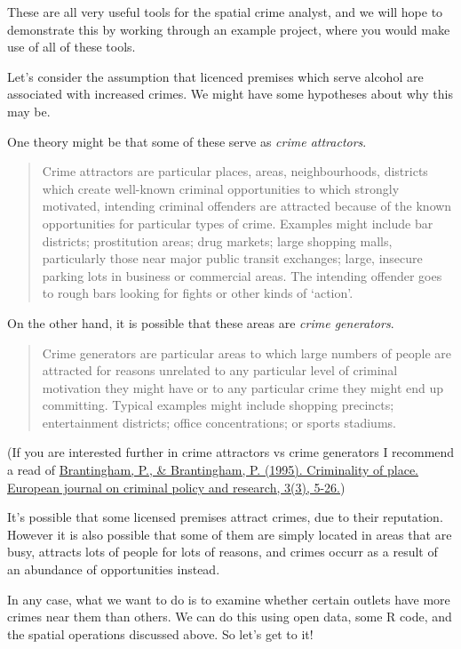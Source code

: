 \documentclass[]{book}
\begin{document}
These are all very useful tools for the spatial crime analyst, and we will hope to demonstrate this by working through an example project, where you would make use of all of these tools.

Let's consider the assumption that licenced premises which serve alcohol are associated with increased crimes. We might have some hypotheses about why this may be.

One theory might be that some of these serve as \emph{crime attractors}.

\begin{quote}
Crime attractors are particular places, areas, neighbourhoods, districts which create well-known criminal opportunities to which strongly motivated, intending criminal offenders are attracted because of the known opportunities for particular types of crime. Examples might include bar districts; prostitution areas; drug markets; large shopping malls, particularly those near major public transit exchanges; large, insecure parking lots in business or commercial areas. The intending offender goes to rough bars looking for fights or other kinds of `action'.
\end{quote}

On the other hand, it is possible that these areas are \emph{crime generators}.

\begin{quote}
Crime generators are particular areas to which large numbers of people are attracted for reasons unrelated to any particular level of criminal motivation they might have or to any particular crime they might end up committing. Typical examples might include shopping precincts; entertainment districts; office concentrations; or sports stadiums.
\end{quote}

(If you are interested further in crime attractors vs crime generators I recommend a read of \href{https://link.springer.com/content/pdf/10.1007/BF02242925.pdf}{Brantingham, P., \& Brantingham, P. (1995). Criminality of place. European journal on criminal policy and research, 3(3), 5-26.})

It's possible that some licensed premises attract crimes, due to their reputation. However it is also possible that some of them are simply located in areas that are busy, attracts lots of people for lots of reasons, and crimes occurr as a result of an abundance of opportunities instead.

In any case, what we want to do is to examine whether certain outlets have more crimes near them than others. We can do this using open data, some R code, and the spatial operations discussed above. So let's get to it!
\end{document}
